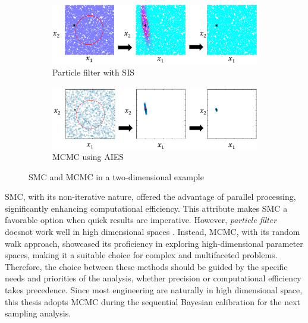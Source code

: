 \begin{figure}
\centering
\begin{subfigure}[htbp]{1.0\textwidth}
   \includegraphics[width=140mm]{Figures/figure-PFvsMCMC-SIS.pdf}
   \caption{Particle filter with \acrlong{SIS}}
   \label{fig: PFvsMCMC_1} 
\end{subfigure}

\begin{subfigure}[htbp]{1.0\textwidth}
   \includegraphics[width=140mm]{Figures/figure-PFvsMCMCAIES.pdf}
   \caption{\acrlong{MCMC} using \acrlong{AIES}}
   \label{fig: PFvsMCMC_2}
\end{subfigure}

\caption[Two sampling method]{\acrshort{SMC} and \acrshort{MCMC} in a two-dimensional example}
\end{figure}

SMC, with its non-iterative nature, offered the advantage of parallel processing, significantly enhancing computational efficiency. This attribute makes \acrshort{SMC} a favorable option when quick results are imperative. However, \textit{particle filter} doesnot work well in high dimensional spaces \citep{murphy2012}. Instead, \acrshort{MCMC}, with its random walk approach, showcased its proficiency in exploring high-dimensional parameter spaces, making it a suitable choice for complex and multifaceted problems. Therefore, the choice between these methods should be guided by the specific needs and priorities of the analysis, whether precision or computational efficiency takes precedence. Since most engineering are naturally in high dimensional space, this thesis adopts \acrshort{MCMC} during the sequential Bayesian calibration for the next sampling analysis.


